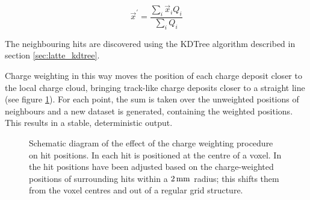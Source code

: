 \begin{equation}\label{eqn:charge_weighted_avg_position}
	\vec{x}^\prime = \frac{\displaystyle \sum_i \vec{x}_i Q_i}{\displaystyle \sum_i Q_i}
\end{equation}

The neighbouring hits are discovered using the \ac{KDTree} algorithm described in section \ref{sec:latte_kdtree}.

Charge weighting in this way moves the position of each charge deposit closer to the local charge cloud, bringing track-like charge deposits closer to a straight line (see figure \ref{fig:ca_charge_weighting}). For each point, the sum is taken over the unweighted positions of neighbours and a new dataset is generated, containing the weighted positions. This results in a stable, deterministic output.

\begin{figure}
\centering
{}
\caption[Diagram of the effect of charge weighting on hit position]{\label{fig:ca_charge_weighting}Schematic diagram of the effect of the charge weighting procedure on hit positions. In  each hit is positioned at the centre of a voxel. In  the hit positions have been adjusted based on the charge-weighted positions of surrounding hits within a $2\,\mathrm{mm}$ radius; this shifts them from the voxel centres and out of a regular grid structure.}
\end{figure}

